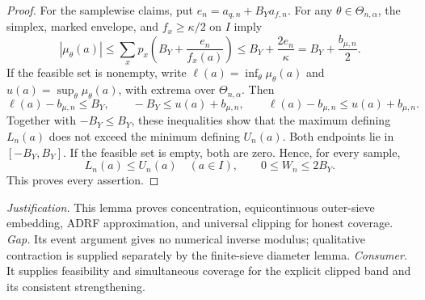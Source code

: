 \documentclass{article}
\begin{document}
\begin{proof}
For the samplewise claims, put \(e_n=a_{q,n}+B_Ya_{f,n}\). For any \(\theta\in\Theta_{n,\alpha}\), the simplex, marked envelope, and \(f_x\ge\kappa/2\) on \(I\) imply
\[
 |\mu_\theta(a)|
 \le\sum_xp_x\left(B_Y+\frac{e_n}{f_x(a)}\right)
 \le B_Y+\frac{2e_n}{\kappa}=B_Y+\frac{b_{\mu,n}}2.
\]
If the feasible set is nonempty, write \(\ell(a)=\inf_\theta\mu_\theta(a)\) and \(u(a)=\sup_\theta\mu_\theta(a)\), with extrema over \(\Theta_{n,\alpha}\). Then
\[
 \ell(a)-b_{\mu,n}\le B_Y,
 \qquad -B_Y\le u(a)+b_{\mu,n},
 \qquad \ell(a)-b_{\mu,n}\le u(a)+b_{\mu,n}.
\]
Together with \(-B_Y\le B_Y\), these inequalities show that the maximum defining \(L_n(a)\) does not exceed the minimum defining \(U_n(a)\). Both endpoints lie in \([-B_Y,B_Y]\). If the feasible set is empty, both are zero. Hence, for every sample,
\[
 L_n(a)\le U_n(a)\quad(a\in I),
 \qquad0\le W_n\le2B_Y.
\]
This proves every assertion.
\end{proof}
\par\smallskip\noindent \textit{Justification.} This lemma proves concentration, equicontinuous outer-sieve embedding, ADRF approximation, and universal clipping for honest coverage. \textit{Gap.} Its event argument gives no numerical inverse modulus; qualitative contraction is supplied separately by the finite-sieve diameter lemma. \textit{Consumer.} It supplies feasibility and simultaneous coverage for the explicit clipped band and its consistent strengthening.
\end{document}

